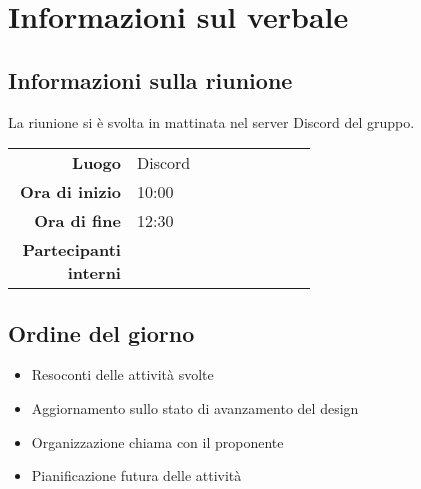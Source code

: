 \section{Informazioni sul verbale}

\subsection{Informazioni sulla riunione}
La riunione si è svolta in mattinata nel server Discord del gruppo.

\begin{center}
	\begin{tabular}{r|p{0.6\linewidth}}
		\toprule
		\textbf{Luogo} & Discord \\
		\textbf{Ora di inizio} & 10:00 \\
		\textbf{Ora di fine} & 12:30 \\
		\textbf{Partecipanti interni} & \groupTeam
	\end{tabular}
\end{center}

\medskip

\subsection{Ordine del giorno}
\begin{itemize}
	\item Resoconti delle attività svolte
	\item Aggiornamento sullo stato di avanzamento del design
	\item Organizzazione chiama con il proponente
	\item Pianificazione futura delle attività
\end{itemize}